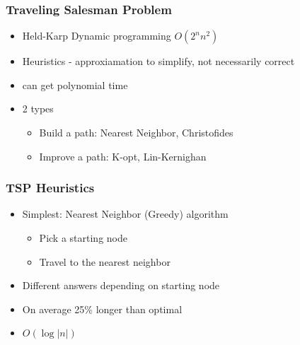 \documentclass{beamer}
\begin{document}
\begin{frame}
\frametitle{Traveling Salesman Problem}

\begin{itemize}

\item Held-Karp Dynamic programming $O(2^n n^2)$
\item Heuristics - approxiamation to simplify, not necessarily correct
\item can get polynomial time
\item 2 types
 \begin{itemize}
 \item Build a path: Nearest Neighbor, Christofides
 \item Improve a path: K-opt, Lin-Kernighan
 \end{itemize}
\end{itemize}

\end{frame}
\begin{frame}
\frametitle{TSP Heuristics}

\begin{itemize}
\item Simplest: Nearest Neighbor (Greedy) algorithm
 \begin{itemize}
 \item Pick a starting node
 \item Travel to the nearest neighbor
 \end{itemize}
\item Different answers depending on starting node
\item On average 25\% longer than optimal
\item $O(\log|n|)$
\end{itemize}


\end{frame}
\end{document}
